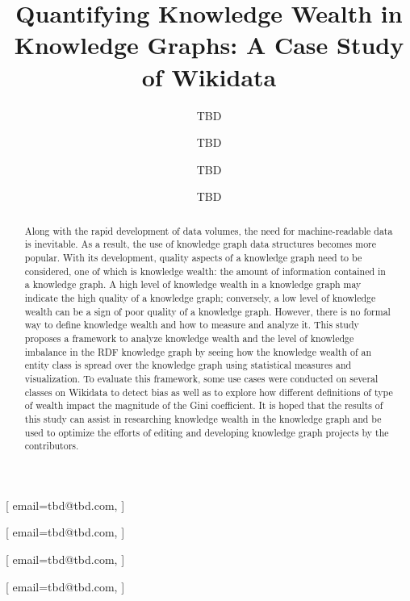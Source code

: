 \documentclass[
]{ceurart}
\begin{document}


\title{Quantifying Knowledge Wealth in Knowledge Graphs: A Case Study of Wikidata}


\author[1]{TBD}[%
email=tbd@tbd.com,
]
\author[1]{TBD}[%
email=tbd@tbd.com,
]
\address[1]{TBD}

\author[2]{TBD}[%
email=tbd@tbd.com,
]
\address[2]{TBD}

\author[3]{TBD}[%
email=tbd@tbd.com,
]
\address[3]{TBD}


\begin{abstract}
Along with the rapid development of data volumes, the need for machine-readable data is inevitable. As a result, the use of knowledge graph data structures becomes more popular. With its development, quality aspects of a knowledge graph need to be considered, one of which is knowledge wealth: the amount of information contained in a knowledge graph. A high level of knowledge wealth in a knowledge graph may indicate the high quality of a knowledge graph; conversely, a low level of knowledge wealth can be a sign of poor quality of a knowledge graph. However, there is no formal way to define knowledge wealth and how to measure and analyze it. This study proposes a framework to analyze knowledge wealth and the level of knowledge imbalance in the RDF knowledge graph by seeing how the knowledge wealth of an entity class is spread over the knowledge graph using statistical measures and visualization. To evaluate this framework, some use cases were conducted on several classes on Wikidata to detect bias as well as to explore how different definitions of type of wealth impact the magnitude of the Gini coefficient. It is hoped that the results of this study can assist in researching knowledge wealth in the knowledge graph and be used to optimize the efforts of editing and developing knowledge graph projects by the contributors.
\end{abstract}
\end{document}
